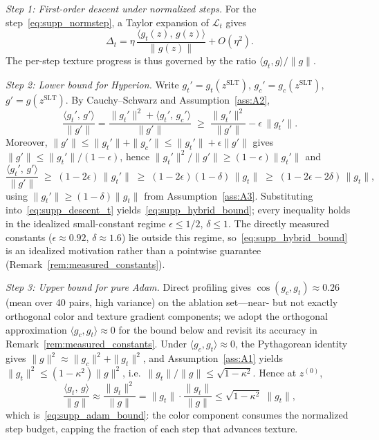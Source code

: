 \begin{IEEEproof}
\emph{Step 1: First-order descent under normalized steps.}
For the step~\eqref{eq:supp_normstep}, a Taylor expansion of
$\mathcal{L}_t$ gives
\begin{equation}
  \Delta_t
  = \eta\,\frac{\langle g_t(z),\, g(z)\rangle}{\|g(z)\|} + O(\eta^2).
  \label{eq:supp_descent_t}
\end{equation}
The per-step texture progress is thus governed by the ratio
$\langle g_t, g\rangle/\|g\|$.

\emph{Step 2: Lower bound for Hyperion.}
Write $g_t' = g_t(z^\mathrm{SLT})$, $g_c' = g_c(z^\mathrm{SLT})$,
$g' = g(z^\mathrm{SLT})$.
By Cauchy--Schwarz and Assumption~\ref{ass:A2},
\begin{equation}
  \frac{\langle g_t',\, g'\rangle}{\|g'\|}
  = \frac{\|g_t'\|^2 + \langle g_t',\, g_c'\rangle}{\|g'\|}
  \;\geq\; \frac{\|g_t'\|^2}{\|g'\|} - \epsilon\,\|g_t'\|.
  \label{eq:supp_hybrid_inner}
\end{equation}
Moreover, $\|g'\| \leq \|g_t'\| + \|g_c'\| \leq \|g_t'\| + \epsilon\|g'\|$
gives $\|g'\| \leq \|g_t'\|/(1-\epsilon)$, hence
$\|g_t'\|^2/\|g'\| \geq (1-\epsilon)\|g_t'\|$ and
\begin{equation}
  \frac{\langle g_t',\, g'\rangle}{\|g'\|}
  \;\geq\; (1 - 2\epsilon)\,\|g_t'\|
  \;\geq\; (1 - 2\epsilon)(1-\delta)\,\|g_t\|
  \;\geq\; (1 - 2\epsilon - 2\delta)\,\|g_t\|,
\end{equation}
using $\|g_t'\| \geq (1-\delta)\|g_t\|$ from Assumption~\ref{ass:A3}.
Substituting into~\eqref{eq:supp_descent_t}
yields~\eqref{eq:supp_hybrid_bound}; every inequality holds in the idealized
small-constant regime $\epsilon \leq 1/2$, $\delta \leq 1$. The directly
measured constants ($\epsilon \approx 0.92$, $\delta \approx 1.6$) lie outside
this regime, so~\eqref{eq:supp_hybrid_bound} is an idealized motivation rather
than a pointwise guarantee (Remark~\ref{rem:measured_constants}).

\emph{Step 3: Upper bound for pure Adam.}
Direct profiling gives $\cos(g_c, g_t) \approx 0.26$ (mean over 40 pairs, high
variance) on the ablation set---near- but not exactly orthogonal color and
texture gradient components; we adopt the orthogonal approximation
$\langle g_c, g_t\rangle \approx 0$ for the bound below and revisit its accuracy
in Remark~\ref{rem:measured_constants}.
Under $\langle g_c, g_t\rangle \approx 0$, the Pythagorean identity gives
$\|g\|^2 \approx \|g_c\|^2 + \|g_t\|^2$, and Assumption~\ref{ass:A1} yields
$\|g_t\|^2 \leq (1-\kappa^2)\|g\|^2$, i.e.\
$\|g_t\|/\|g\| \leq \sqrt{1-\kappa^2}$.
Hence at $z^{(0)}$,
\begin{equation}
  \frac{\langle g_t,\, g\rangle}{\|g\|}
  \approx \frac{\|g_t\|^2}{\|g\|}
  = \|g_t\|\cdot\frac{\|g_t\|}{\|g\|}
  \leq \sqrt{1-\kappa^2}\;\|g_t\|,
  \label{eq:supp_adam_inner}
\end{equation}
which is~\eqref{eq:supp_adam_bound}: the color component consumes the
normalized step budget, capping the fraction of each step that advances
texture.


\end{IEEEproof}
